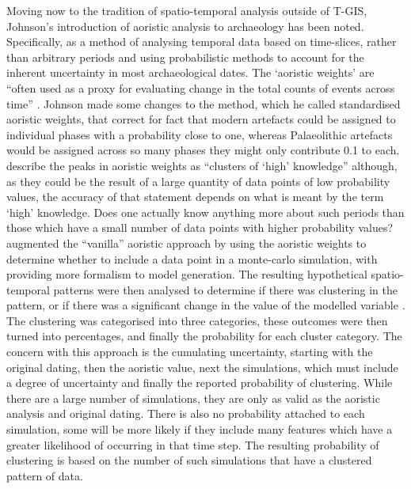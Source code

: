 Moving now to the tradition of spatio-temporal analysis outside of T-GIS, Johnson's introduction of aoristic analysis to archaeology \citep{Johnson:2004fk} has been noted. Specifically, as a method of analysing temporal data based on time-slices, rather than arbitrary periods and using probabilistic methods to account for the inherent uncertainty in most archaeological dates. The `aoristic weights' are ``often used as a proxy for evaluating change in the total counts of events across time'' \citep[448]{Crema2012}. Johnson made some changes to the method, which he called standardised aoristic weights, that correct for fact that modern artefacts could be assigned to individual phases with a probability close to one, whereas Palaeolithic artefacts would be assigned across so many phases they might only contribute 0.1 to each. \citet{Crema20101118} describe the peaks in aoristic weights as ``clusters of `high' knowledge'' \citep[1121]{Crema20101118} although, as they could be the result of a large quantity of data points of low probability values, the accuracy of that statement depends on what is meant by the term `high' knowledge. Does one actually know anything more about such periods than those which have a small number of data points with higher probability values? \citet{Crema2012,Crema20101118} augmented the ``vanilla'' aoristic approach by using the aoristic weights to determine whether to include a data point in a monte-carlo simulation, with \citet{Baxter2016120} providing more formalism to model generation. The resulting hypothetical spatio-temporal patterns were then analysed to determine if there was clustering in the pattern, \citep[1122]{Crema20101118} or if there was a significant change in the value of the modelled variable \citep[452]{Crema2012}. The clustering was categorised into three categories, these outcomes were then turned into percentages, and finally the probability for each cluster category. The concern with this approach is the cumulating uncertainty, starting with the original dating, then the aoristic value, next the simulations, which must include a degree of uncertainty and finally the reported probability of clustering. While there are a large number of simulations, they are only as valid as the aoristic analysis and original dating. There is also no probability attached to each simulation, some will be more likely if they include many features which have a greater likelihood of occurring in that time step. The resulting probability of clustering is based on the number of such simulations that have a clustered pattern of data.

